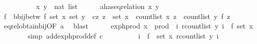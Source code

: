 \begin{isabellebody}
\ \ \isamarkupfalse%
\ {\isacharminus}{\kern0pt}\isanewline
\ \ \ \ \isamarkupfalse%
\ x\ y\ {\isacharcolon}{\kern0pt}{\isacharcolon}{\kern0pt}\ {\isachardoublequoteopen}nat\ list{\isachardoublequoteclose}\isanewline
\ \ \ \ \isamarkupfalse%
\ a{\isacharcolon}{\kern0pt}{\isachardoublequoteopen}has{\isacharunderscore}{\kern0pt}eq{\isacharunderscore}{\kern0pt}relation\ x\ y{\isachardoublequoteclose}\isanewline
\ \ \ \ \isamarkupfalse%
\ \isamarkupfalse%
\ f\ \ b{\isacharcolon}{\kern0pt}{\isachardoublequoteopen}bij{\isacharunderscore}{\kern0pt}betw\ f\ {\isacharparenleft}{\kern0pt}set\ x{\isacharparenright}{\kern0pt}\ {\isacharparenleft}{\kern0pt}set\ y{\isacharparenright}{\kern0pt}{\isachardoublequoteclose}\ \ c{\isacharcolon}{\kern0pt}{\isachardoublequoteopen}{\isasymAnd}z{\isachardot}{\kern0pt}\ z\ {\isasymin}\ set\ x\ {\isasymLongrightarrow}\ count{\isacharunderscore}{\kern0pt}list\ x\ z\ {\isacharequal}{\kern0pt}\ count{\isacharunderscore}{\kern0pt}list\ y\ {\isacharparenleft}{\kern0pt}f\ z{\isacharparenright}{\kern0pt}{\isachardoublequoteclose}\isanewline
\ \ \ \ \ \ \isamarkupfalse%
\ eq{\isacharunderscore}{\kern0pt}rel{\isacharunderscore}{\kern0pt}obtain{\isacharunderscore}{\kern0pt}bij{\isacharbrackleft}{\kern0pt}OF\ a{\isacharbrackright}{\kern0pt}\ \isamarkupfalse%
\ blast\isanewline
\ \ \ \ \isamarkupfalse%
\ {\isachardoublequoteopen}exp{\isacharunderscore}{\kern0pt}h{\isacharunderscore}{\kern0pt}prod\ x\ {\isacharequal}{\kern0pt}\ prod\ {\isacharparenleft}{\kern0pt}\ {\isacharparenleft}{\kern0pt}{\isasymlambda}i{\isachardot}{\kern0pt}\ r{\isacharparenleft}{\kern0pt}count{\isacharunderscore}{\kern0pt}list\ y\ i{\isacharparenright}{\kern0pt}{\isacharparenright}{\kern0pt}\ {\isasymcirc}\ f{\isacharparenright}{\kern0pt}\ {\isacharparenleft}{\kern0pt}set\ x{\isacharparenright}{\kern0pt}{\isachardoublequoteclose}\isanewline
\ \ \ \ \ \ \isamarkupfalse%
\ {\isacharparenleft}{\kern0pt}simp\ add{\isacharcolon}{\kern0pt}exp{\isacharunderscore}{\kern0pt}h{\isacharunderscore}{\kern0pt}prod{\isacharunderscore}{\kern0pt}def\ c{\isacharparenright}{\kern0pt}\isanewline
\ \ \ \ \isamarkupfalse%
\ \isamarkupfalse%
\ {\isachardoublequoteopen}{\isachardot}{\kern0pt}{\isachardot}{\kern0pt}{\isachardot}{\kern0pt}\ {\isacharequal}{\kern0pt}\ {\isacharparenleft}{\kern0pt}{\isasymProd}i\ {\isasymin}\ f\ {\isacharbackquote}{\kern0pt}\ {\isacharparenleft}{\kern0pt}set\ x{\isacharparenright}{\kern0pt}{\isachardot}{\kern0pt}\ r{\isacharparenleft}{\kern0pt}count{\isacharunderscore}{\kern0pt}list\ y\ i{\isacharparenright}{\kern0pt}{\isacharparenright}{\kern0pt}{\isachardoublequoteclose}\isanewline

\end{isabellebody}
